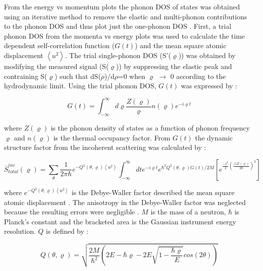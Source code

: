 From the energy vs momentum plots the phonon DOS of states was obtained using an iterative method to remove the elastic and multi-phonon contributions to the phonon DOS and thus plot just the one-phonon DOS \cite{Fultz2009,Squires2012}. First, a trial phonon DOS from the momenta vs energy plots was used to calculate the time dependent self-correlation function ($G(t)$) and the mean square atomic displacement $\left< u^{2} \right>$. The trial single-phonon DOS (S'($\varrho$)) was obtained by modifying the measured signal (S($\varrho$)) by suppressing the elastic peak and contraining S($\varrho$) such that dS($\rho$)/d$\rho$=0 when $\varrho$ $\rightarrow$ 0 according to the hydrodynamic limit. Using the trial phonon DOS, $G(t)$ was expressed by \cite{Manley2001,Manley2002}:

\begin{equation}
\label{eq: td_selfcorrelation}
G (t) = \int_{- \infty}^{\infty} d \varrho \frac{Z(\varrho)}{\varrho} n(\varrho) e^{- i \varrho t}
\end{equation}


\noindent where $Z(\varrho)$ is the phonon density of states as a function of phonon frequency $\varrho$ and $n(\varrho)$ is the thermal occupancy factor. From $G(t)$  the dynamic structure factor from the incoherent scattering was calculated by \cite{Manley2001,Manley2002}:

\begin{equation}
\label{eq: S_total_inc}
\overline{S}_{total}^{inc} (\varrho) = \sum_{\theta} \frac{1}{2 \pi \hbar} e^{- Q^{2} (\theta, \varrho) \left<u^{2} \right>} \int_{-\infty}^{\infty} dte^{-i \varrho t} e^{\hbar^{2}Q^{2}(\theta, \varrho) G(t)/2M} \left[ e^{\frac{-t^{2}}{2} \left(\frac{\bigtriangleup E (\varrho)}{2\hbar} \right)^{2}} \right]
\end{equation}

\noindent where $e^{-Q^{2}\left(\theta,\varrho \right) \left< u^{2} \right>}$ is the Debye-Waller factor described the mean square atomic displacement \cite{Squires2012}. The anisotropy in the Debye-Waller factor was neglected because the resulting errors were negligible \cite{Manley2001}.  $M$ is the mass of a neutron, $\hbar$ is Planck's constant and the bracketed area is the Gaussian instrument energy resolution. $Q$ is defined by \cite{Manley2001,Manley2002}:

\begin{equation}
\label{eq: Q}
Q(\theta, \varrho) = \sqrt{\frac{2M}{\hbar^{2}} \left( 2E - \hbar \varrho - 2E \sqrt{1-\frac{\hbar \varrho}{E}}cos(2\theta) \right)}
\end{equation}

